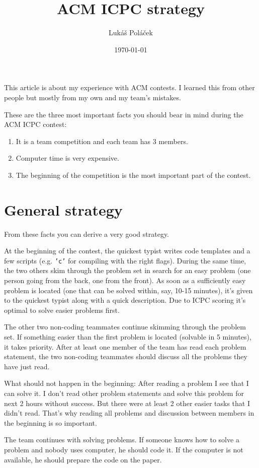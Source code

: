 \documentclass{article}
\author{Lukáš Poláček}
\title{ACM ICPC strategy}
\date{\today}
\begin{document}
\maketitle
This article is about my experience with ACM contests. I learned this from other
people but mostly from my own and my team's mistakes.

These are the three most important facts you should bear in mind during the ACM ICPC
contest:
\begin{enumerate}
\item It is a team competition and each team has 3 members.
\item Computer time is very expensive.
\item The beginning of the competition is the most important part of the contest.
\end{enumerate}

\section{General strategy}
From these facts you can derive a very good strategy.

At the beginning of the contest, the quickest typist writes code templates and a
few scripts (e.g. {\tt 'c'} for compiling with the right flags). During the same
time, the two others skim through the problem set in search for an easy problem
(one person going from the back, one from the front). As soon as a sufficiently
easy problem is located (one that can be solved within, say, 10-15 minutes),
it's given to the quickest typist along with a quick description. Due to ICPC
scoring it's optimal to solve easier problems first.

The other two non-coding teammates continue skimming through the problem set.
If something easier than the first problem is located (solvable in 5 minutes),
it takes priority. After at least one member of the team has read each problem
statement, the two non-coding teammates should discuss all the problems they
have just read.

What should not happen in the beginning: After reading a problem I see that I
can solve it. I don't read other problem statements and solve this problem for
next 2 hours without success. But there were at least 2 other easier tasks that
I didn't read. That's why reading all problems and discussion between members in
the beginning is so important.

The team continues with solving problems. If someone knows how to solve a
problem and nobody uses computer, he should code it. If the computer is not
available, he should prepare the code on the paper.
\end{document}
